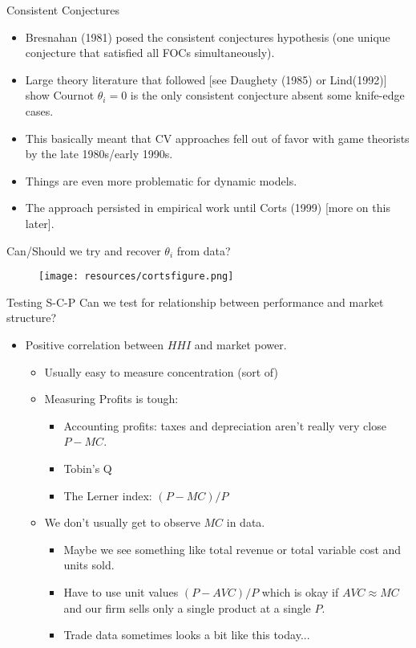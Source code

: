\begin{frame}{Consistent Conjectures}
\begin{itemize}
\item Bresnahan (1981) posed the consistent conjectures hypothesis (one unique conjecture that satisfied all FOCs simultaneously).
\item Large theory literature that followed [see Daughety (1985) or Lind(1992)] show Cournot $\theta_i=0$ is the only consistent conjecture absent some knife-edge cases.
\item This basically meant that CV approaches fell out of favor with game theorists by the late 1980s/early 1990s.
\item Things are even more problematic for dynamic models.
\item The approach persisted in empirical work until Corts (1999) [more on this later].
\end{itemize}
\end{frame}

\begin{frame}{Can/Should we try and recover $\theta_i$ from data?}
\begin{figure}
\begin{center}
\texttt{[image: resources/cortsfigure.png]}
\end{center}
\end{figure}
\end{frame}



\begin{frame}{Testing S-C-P }
Can we test for relationship between performance and market structure?
\begin{itemize}
\item Positive correlation between $HHI$ and market power.
\begin{itemize}
\item Usually easy to measure concentration (sort of)
\item Measuring Profits is tough:
\begin{itemize}
\item Accounting profits: taxes and depreciation aren't really very close $P-MC$.
\item Tobin's Q
\item The Lerner index: $(P-MC)/P$
\end{itemize}
\item We don't usually get to observe $MC$ in data.

\begin{itemize}
\item Maybe we see something like total revenue or total variable cost and units sold.
\item Have to use unit values $(P-AVC)/P$ which is okay if $AVC \approx MC$ and our firm sells only a single product at a single $P$.
\item Trade data sometimes looks a bit like this today...
\end{itemize}
\end{itemize}
\end{itemize}
\end{frame}


